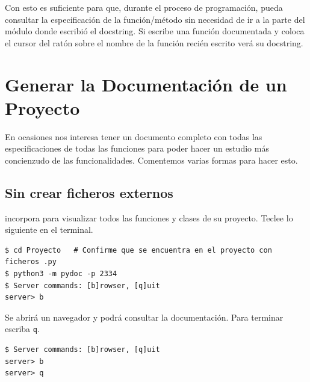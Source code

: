 Con esto es suficiente para que, durante el proceso de programación, pueda consultar la especificación de la función/método sin necesidad de ir a la parte del módulo donde escribió el docstring. Si escribe una función documentada y coloca el cursor del ratón sobre el nombre de la función recién escrito verá su docstring.




\section{Generar la Documentación de un Proyecto} %


En ocasiones nos interesa tener un documento completo con todas las especificaciones de todas las funciones para poder hacer un estudio más concienzudo de las funcionalidades. Comentemos varias formas para hacer esto.
 



\subsection{Sin crear ficheros externos}

 incorpora  para visualizar todos las funciones y clases de su proyecto.
Teclee lo siguiente en el terminal.

\begin{Verbatim}
$ cd Proyecto   # Confirme que se encuentra en el proyecto con ficheros .py
$ python3 -m pydoc -p 2334
$ Server commands: [b]rowser, [q]uit
server> b
\end{Verbatim}

Se abrirá un navegador y podrá consultar la documentación. Para terminar escriba {\tt q}.
\begin{Verbatim}
$ Server commands: [b]rowser, [q]uit
server> b
server> q
\end{Verbatim}



